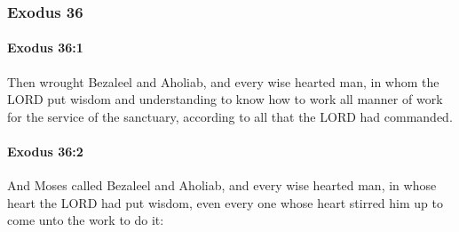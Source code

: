 	\subsubsection{Exodus 36} %
		\label{EXODUS-36}

		\paragraph{Exodus 36:1} %
			\label{EXODUS-36-1}

			Then wrought Bezaleel and Aholiab, and every wise hearted man, in whom the LORD put wisdom and understanding to know how to work all manner of work for the service of the sanctuary, according to all that the LORD had commanded.


		\paragraph{Exodus 36:2} %
			\label{EXODUS-36-2}

			And Moses called Bezaleel and Aholiab, and every wise hearted man, in whose heart the LORD had put wisdom, even every one whose heart stirred him up to come unto the work to do it:

